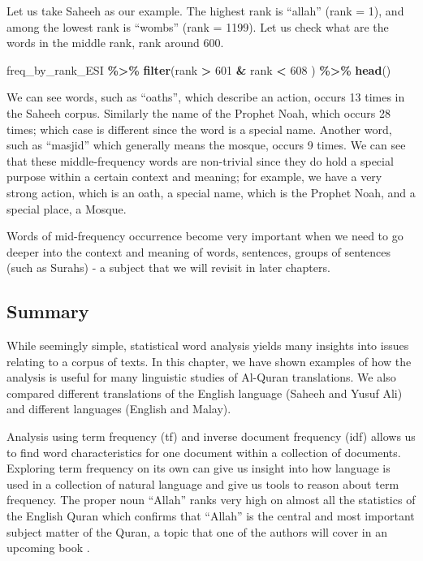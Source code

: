 \documentclass[
]{article}
\newenvironment{Shaded}{\begin{snugshade}}{\end{snugshade}}
\newcommand{\DecValTok}[1]{\textcolor[rgb]{0.00,0.00,0.81}{#1}}
\newcommand{\FunctionTok}[1]{\textcolor[rgb]{0.13,0.29,0.53}{\textbf{#1}}}
\newcommand{\NormalTok}[1]{#1}
\newcommand{\SpecialCharTok}[1]{\textcolor[rgb]{0.81,0.36,0.00}{\textbf{#1}}}
\begin{document}
Let us take Saheeh as our example. The highest rank is ``allah'' (rank = 1), and among the lowest rank is ``wombs'' (rank = 1199). Let us check what are the words in the middle rank, rank around 600.

\footnotesize

\begin{Shaded}
\begin{Highlighting}[]
\NormalTok{freq\_by\_rank\_ESI }\SpecialCharTok{\%\textgreater{}\%} \FunctionTok{filter}\NormalTok{(rank }\SpecialCharTok{\textgreater{}} \DecValTok{601} \SpecialCharTok{\&}\NormalTok{ rank }\SpecialCharTok{\textless{}} \DecValTok{608}\NormalTok{ ) }\SpecialCharTok{\%\textgreater{}\%} \FunctionTok{head}\NormalTok{()}
\end{Highlighting}
\end{Shaded}

\normalsize

We can see words, such as ``oaths'', which describe an action, occurs 13 times in the Saheeh corpus. Similarly the name of the Prophet Noah, which occurs 28 times; which case is different since the word is a special name. Another word, such as ``masjid'' which generally means the mosque, occurs 9 times. We can see that these middle-frequency words are non-trivial since they do hold a special purpose within a certain context and meaning; for example, we have a very strong action, which is an oath, a special name, which is the Prophet Noah, and a special place, a Mosque.

Words of mid-frequency occurrence become very important when we need to go deeper into the context and meaning of words, sentences, groups of sentences (such as Surahs) - a subject that we will revisit in later chapters.

\hypertarget{chapter-2-summary}{%
\subsection{Summary}\label{chapter-2-summary}}

While seemingly simple, statistical word analysis yields many insights into issues relating to a corpus of texts. In this chapter, we have shown examples of how the analysis is useful for many linguistic studies of Al-Quran translations. We also compared different translations of the English language (Saheeh and Yusuf Ali) and different languages (English and Malay).

Analysis using term frequency (tf) and inverse document frequency (idf) allows us to find word characteristics for one document within a collection of documents. Exploring term frequency on its own can give us insight into how language is used in a collection of natural language and give us tools to reason about term frequency. The proper noun ``Allah'' ranks very high on almost all the statistics of the English Quran which confirms that ``Allah'' is the central and most important subject matter of the Quran, a topic that one of the authors will cover in an upcoming book \citep{alsuwaidan2021}.
\end{document}
